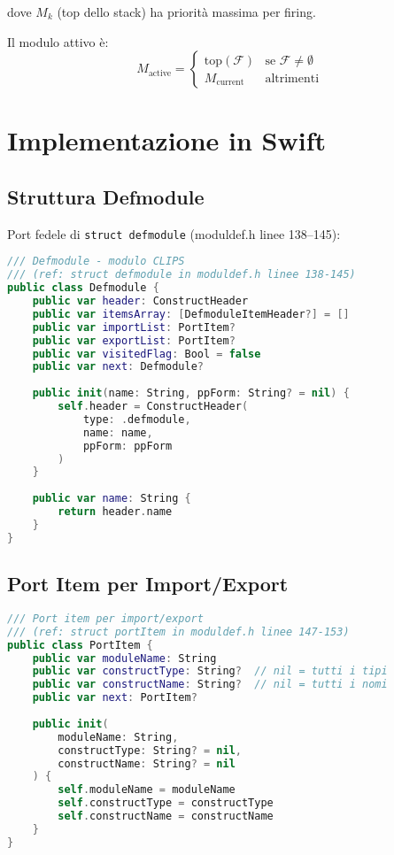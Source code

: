 dove $M_k$ (top dello stack) ha priorità massima per firing.

\begin{definizione}
Il modulo attivo è:
\begin{equation}
M_{\text{active}} = \begin{cases}
\text{top}(\mathcal{F}) & \text{se } \mathcal{F} \neq \emptyset\\
M_{\text{current}} & \text{altrimenti}
\end{cases}
\end{equation}
\end{definizione}

\section{Implementazione in Swift}

\subsection{Struttura Defmodule}

Port fedele di \texttt{struct defmodule} (moduldef.h linee 138--145):

\begin{lstlisting}[language=Swift]
/// Defmodule - modulo CLIPS
/// (ref: struct defmodule in moduldef.h linee 138-145)
public class Defmodule {
    public var header: ConstructHeader
    public var itemsArray: [DefmoduleItemHeader?] = []
    public var importList: PortItem?
    public var exportList: PortItem?
    public var visitedFlag: Bool = false
    public var next: Defmodule?
    
    public init(name: String, ppForm: String? = nil) {
        self.header = ConstructHeader(
            type: .defmodule,
            name: name,
            ppForm: ppForm
        )
    }
    
    public var name: String {
        return header.name
    }
}
\end{lstlisting}

\subsection{Port Item per Import/Export}

\begin{lstlisting}[language=Swift]
/// Port item per import/export
/// (ref: struct portItem in moduldef.h linee 147-153)
public class PortItem {
    public var moduleName: String
    public var constructType: String?  // nil = tutti i tipi
    public var constructName: String?  // nil = tutti i nomi
    public var next: PortItem?
    
    public init(
        moduleName: String,
        constructType: String? = nil,
        constructName: String? = nil
    ) {
        self.moduleName = moduleName
        self.constructType = constructType
        self.constructName = constructName
    }
}
\end{lstlisting}

